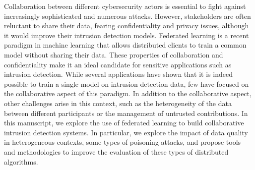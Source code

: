 Collaboration between different cybersecurity actors is essential to fight against increasingly sophisticated and numerous attacks.
However, stakeholders are often reluctant to share their data, fearing confidentiality and privacy issues, although it would improve their intrusion detection models.
Federated learning is a recent paradigm in machine learning that allows distributed clients to train a common model without sharing their data.
These properties of collaboration and confidentiality make it an ideal candidate for sensitive applications such as intrusion detection.
While several applications have shown that it is indeed possible to train a single model on intrusion detection data, few have focused on the collaborative aspect of this paradigm.
In addition to the collaborative aspect, other challenges arise in this context, such as the heterogeneity of the data between different participants or the management of untrusted contributions.
%
In this manuscript, we explore the use of federated learning to build collaborative intrusion detection systems.
In particular, we explore the impact of data quality in heterogeneous contexts, some types of poisoning attacks, and propose tools and methodologies to improve the evaluation of these types of distributed algorithms.